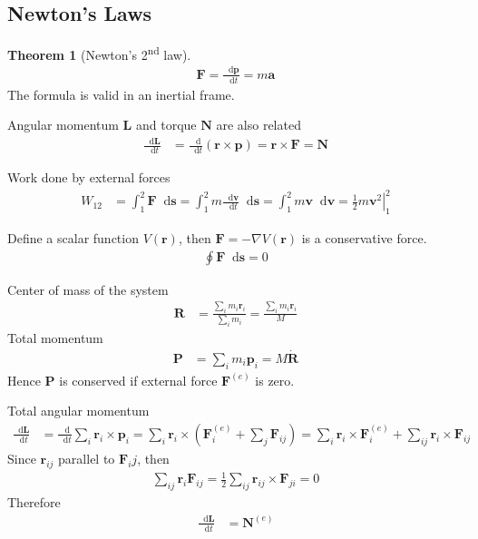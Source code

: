 \documentclass[twoside,11pt]{article}
\numberwithin{equation}{section} %
\newcommand{\lms}{\fontfamily{lmss}\selectfont} %
\renewcommand*\d{\mathop{}\!\mathrm{d}}
\theoremstyle{definition}
\newtheorem{theorem}{\lms Theorem}[section]
\theoremstyle{remark}
\begin{document}
\subsection{Newton's Laws}
\begin{theorem}[Newton's 2\textsuperscript{nd} law]
\begin{align}
    \mathbf{F} = \frac{\d \mathbf{p}}{\d t} = m\mathbf{a}
\end{align}
The formula is valid in an inertial frame.
\end{theorem}
Angular momentum $\mathbf{L}$ and torque $\mathbf{N}$ are also related
\begin{align}
    \frac{\d\mathbf{L}}{\d t} &= 
    \frac{\d}{\d t}(\mathbf{r}\times\mathbf{p})
    = \mathbf{r}\times\mathbf{F}
    = \mathbf{N}
\end{align}

Work done by external forces
\begin{align}
    W_{12} &= \int_1^2\mathbf{F}\d\mathbf{s}
    = \int_1^2 m\frac{\d\mathbf{v}}{\d t}\d\mathbf{s}
    = \int_1^2 m\mathbf{v}\d\mathbf{v}
    = \left.\frac{1}{2}m\mathbf{v}^2\right|_1^2
\end{align}

Define a scalar function $V(\mathbf{r})$,
then $\mathbf{F}=-\nabla V(\mathbf{r})$ is a conservative force.
\begin{align}
    \oint \mathbf{F}\d\mathbf{s} = 0
\end{align}

Center of mass of the system
\begin{align}
    \mathbf{R} &= 
    \frac{\sum_i m_i\mathbf{r}_i}{\sum_i m_i}
    =
    \frac{\sum_i m_i\mathbf{r}_i}{M}
\end{align}
Total momentum
\begin{align}
    \mathbf{P} 
    &= 
    \sum_i m_i\mathbf{p}_i
    = M\dot{\mathbf{R}}
\end{align}
Hence $\mathbf{P}$ is conserved if external force $\mathbf{F}^{(e)}$ is
zero.

Total angular momentum
\begin{align*}
    \frac{\d \mathbf{L}}{\d t} &= 
    \frac{\d }{\d t} \sum_i\mathbf{r}_i\times\mathbf{p}_i
    = \sum_i \mathbf{r}_i\times \left(
        \mathbf{F}_i^{(e)} + \sum_j \mathbf{F}_{ij}
    \right)
    = \sum_i\mathbf{r}_i\times\mathbf{F}_i^{(e)}
    + \sum_{ij}\mathbf{r}_i\times\mathbf{F}_{ij}
\end{align*}
Since $\mathbf{r}_{ij}$ parallel to $\mathbf{F}_ij$, then
\begin{align}
    \sum_{ij}\mathbf{r}_i\mathbf{F}_{ij} = 
    \frac{1}{2}\sum_{ij}\mathbf{r}_{ij}\times\mathbf{F}_{ji} = 0
\end{align}
Therefore
\begin{align}
    \frac{\d\mathbf{L}}{\d t} &= \mathbf{N}^{(e)}
\end{align}
\end{document}
